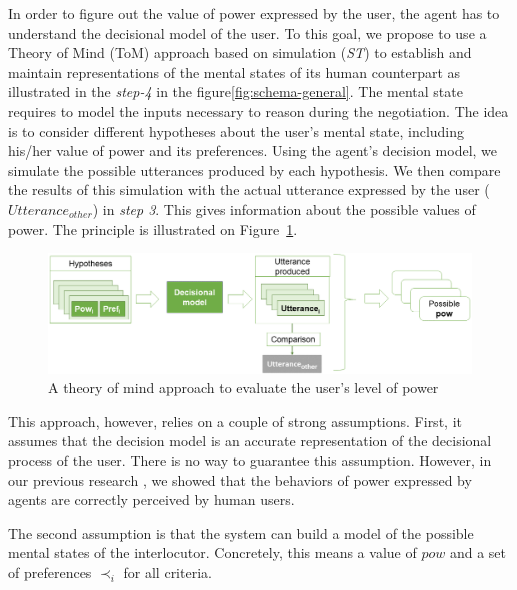 \documentclass[conference, letterpaper]{IEEEtran}
\begin{document}
	In order to figure out the value of power expressed by the user, the agent has to understand the decisional model of the user. To this goal, we propose to use a Theory of Mind (ToM) approach \cite{premack1978does} based on simulation (\emph{ST}) to establish and maintain representations of the mental states of its human counterpart as illustrated in the \emph{step-4} in the figure\ref{fig:schema-general}. 
	The mental state requires to model the inputs necessary to reason during the negotiation. The idea is to consider different hypotheses about the user's mental state, including his/her value of power and its preferences. Using the agent's decision model, we simulate the possible utterances produced by each hypothesis. 
	We then compare the results of this simulation with the actual utterance expressed by the user ($Utterance_{other}$) in \textit{step 3}. This gives information about the possible values of power. The principle is illustrated on Figure~\ref{fig:tom}.
	
	\begin{figure}
		\centering
		\includegraphics[width=0.8\linewidth]{figs/model/tom_select.png}
		\caption{A theory of mind approach to evaluate the user's level of power} 
		\label{fig:tom}
	\end{figure} 
	
	This approach, however, relies on a couple of strong assumptions. First, it assumes that the decision model is an accurate representation of the decisional process of the user. There is no way to guarantee this assumption. However, in our previous research \cite{ouali2017computational}, we showed that the behaviors of power expressed by agents are correctly perceived by human users. 
	
	The second assumption is that the system can build a model of the possible mental states of the interlocutor. Concretely, this means a value of $pow$ and a set of preferences $\prec_i$ for all criteria. 
	
\end{document}
